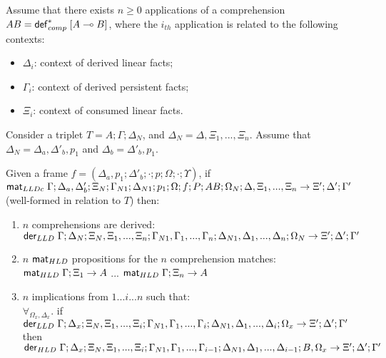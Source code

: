 \begin{theorem}\label{thm:multiple_comprehension_derivation}
Assume that there exists $n \geq 0$ applications of a comprehension
$AB = \mathsf{def}_{comp}^{*} \; [A \multimap B]$, where the $i_{th}$ application is related to the following contexts:
\begin{itemize}
   \item $\Delta_i$: context of derived linear facts;
   \item $\Gamma_i$: context of derived persistent facts;
   \item $\Xi_i$: context of consumed linear facts.
\end{itemize}

Consider a triplet $T = A; \Gamma; \Delta_{N}$, and $\Delta_N = \Delta, \Xi_1,
         ..., \Xi_n$.  Assume that $\Delta_N = \Delta_a, \Delta'_b, p_1$ and
         $\Delta_b = \Delta'_b, p_1$.

Given a frame $f = (\Delta_a, p_1; \Delta'_b; \cdot; p; \Omega; \cdot;
      \Upsilon)$, if $\mathsf{mat}_{LLDc} \; \Gamma; \Delta_a, \Delta'_b; \Xi_N; \Gamma_{N1}; \Delta_{N1}; p_1;
\Omega; f; P; AB; \Omega_N; \Delta, \Xi_1, ..., \Xi_n \rightarrow \Xi'; \Delta'; \Gamma'$ (well-formed in relation to $T$) then:
   
\end{theorem}
\iffalse
   \begin{enumerate}
      \item $n$ comprehensions are derived:\\
      $\mathsf{der}_{LLD} \; \Gamma; \Delta_N; \Xi_N, \Xi_1, ..., \Xi_n; \Gamma_{N1}, \Gamma_1, ..., \Gamma_n; \Delta_{N1}, \Delta_1, ..., \Delta_n; \Omega_N \rightarrow \Xi'; \Delta'; \Gamma'$
      \item $n$ $\mathsf{mat}_{HLD} \;$propositions for the $n$ comprehension matches:\\
      $\mathsf{mat}_{HLD} \; \Gamma; \Xi_1 \rightarrow A$ ... $\mathsf{mat}_{HLD} \; \Gamma; \Xi_n \rightarrow A$
      \item $n$ implications from $1...i...n$ such that: \\
      $\forall_{\Omega_x, \Delta_x}.$ if $\mathsf{der}_{LLD} \; \Gamma; \Delta_x; \Xi_N, \Xi_1, ..., \Xi_i; \Gamma_{N1}, \Gamma_1, ..., \Gamma_i; \Delta_{N1}, \Delta_1, ..., \Delta_i; \Omega_x \rightarrow \Xi'; \Delta'; \Gamma'$ then \linebreak $\mathsf{der}_{HLD} \; \Gamma; \Delta_x; \Xi_N, \Xi_1, ..., \Xi_i; \Gamma_{N1}, \Gamma_1, ..., \Gamma_{i-1}; \Delta_{N1}, \Delta_1, ..., \Delta_{i-1}; B, \Omega_x \rightarrow \Xi'; \Delta'; \Gamma'$
   \end{enumerate}
   
